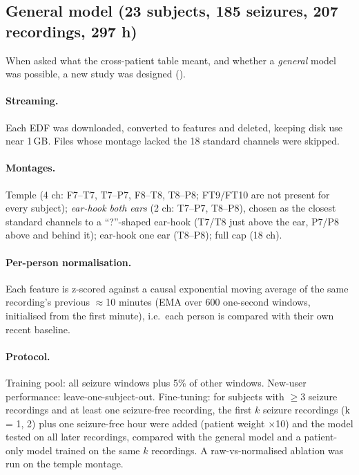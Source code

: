 \subsection{General model (23 subjects, 185 seizures, 207 recordings, 297 h)}

When asked what the cross-patient table meant, and whether a \emph{general} model was possible, a new study was designed ().

\paragraph{Streaming.} Each EDF was downloaded, converted to features and deleted, keeping disk use near 1\,GB. Files whose montage lacked the 18 standard channels were skipped.

\paragraph{Montages.} Temple (4 ch: F7--T7, T7--P7, F8--T8, T8--P8; FT9/FT10 are not present for every subject); \emph{ear-hook both ears} (2 ch: T7--P7, T8--P8), chosen as the closest standard channels to a ``?''-shaped ear-hook (T7/T8 just above the ear, P7/P8 above and behind it); ear-hook one ear (T8--P8); full cap (18 ch).

\paragraph{Per-person normalisation.} Each feature is z-scored against a causal exponential moving average of the same recording's previous $\approx$10 minutes (EMA over 600 one-second windows, initialised from the first minute), i.e.\ each person is compared with their own recent baseline.

\paragraph{Protocol.} Training pool: all seizure windows plus 5\% of other windows. New-user performance: leave-one-subject-out. Fine-tuning: for subjects with $\ge$3 seizure recordings and at least one seizure-free recording, the first $k$ seizure recordings (k = 1, 2) plus one seizure-free hour were added (patient weight $\times$10) and the model tested on all later recordings, compared with the general model and a patient-only model trained on the same $k$ recordings. A raw-vs-normalised ablation was run on the temple montage.

